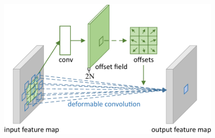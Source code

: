 \begin{figure}[t]
    \centerline{\includegraphics[width=0.6\linewidth]{figures/methodology/deformable_convolution.pdf}}
    \caption[\Gls{dcnn}]{ }
    \label{fig:FCOSCenterness}
\end{figure}
